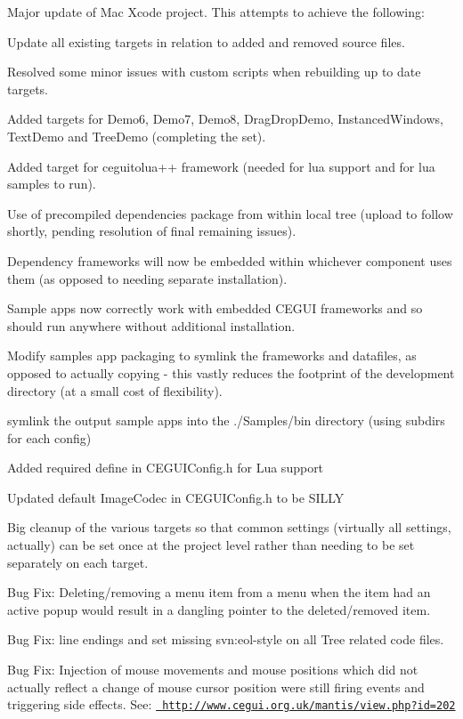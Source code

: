 \begin{DoxyItemize}
\item Major update of Mac Xcode project. This attempts to achieve the following\+:
\begin{DoxyItemize}
\item Update all existing targets in relation to added and removed source files.
\item Resolved some minor issues with custom scripts when rebuilding up to date targets.
\item Added targets for Demo6, Demo7, Demo8, Drag\+Drop\+Demo, Instanced\+Windows, Text\+Demo and Tree\+Demo (completing the set).
\item Added target for ceguitolua++ framework (needed for lua support and for lua samples to run).
\item Use of precompiled dependencies package from within local tree (upload to follow shortly, pending resolution of final remaining issues).
\item Dependency frameworks will now be embedded within whichever component uses them (as opposed to needing separate installation).
\item Sample apps now correctly work with embedded C\+E\+G\+UI frameworks and so should run anywhere without additional installation.
\item Modify samples app packaging to symlink the frameworks and datafiles, as opposed to actually copying -\/ this vastly reduces the footprint of the development directory (at a small cost of flexibility).
\item symlink the output sample apps into the ./\+Samples/bin directory (using subdirs for each config)
\item Added required define in C\+E\+G\+U\+I\+Config.\+h for Lua support
\item Updated default Image\+Codec in C\+E\+G\+U\+I\+Config.\+h to be S\+I\+L\+LY
\item Big cleanup of the various targets so that common settings (virtually all settings, actually) can be set once at the project level rather than needing to be set separately on each target.
\end{DoxyItemize}
\item Bug Fix\+: Deleting/removing a menu item from a menu when the item had an active popup would result in a dangling pointer to the deleted/removed item.
\item Bug Fix\+: line endings and set missing svn\+:eol-\/style on all Tree related code files.
\item Bug Fix\+: Injection of mouse movements and mouse positions which did not actually reflect a change of mouse cursor position were still firing events and triggering side effects. See\+: \href{http://www.cegui.org.uk/mantis/view.php?id=202}{\texttt{ http\+://www.\+cegui.\+org.\+uk/mantis/view.\+php?id=202}}

\end{DoxyItemize}
